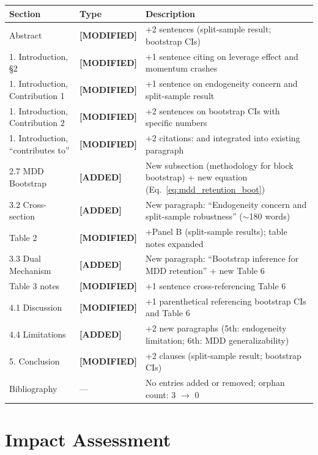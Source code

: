 \documentclass[12pt,a4paper]{article}
\newcommand{\ADDED}{\textcolor{added}{\textbf{[ADDED]}}}
\newcommand{\MODIFIED}{\textcolor{modified}{\textbf{[MODIFIED]}}}
\begin{document}
\begin{longtable}{@{}p{3.5cm}p{1.5cm}p{9cm}@{}}
\toprule
Section & Type & Description \\
\midrule
\endhead
Abstract & \MODIFIED & +2 sentences (split-sample result; bootstrap CIs) \\
\midrule
1. Introduction, \S2 & \MODIFIED & +1 sentence citing \citet{barroso2015} on leverage effect and momentum crashes \\
\midrule
1. Introduction, Contribution 1 & \MODIFIED & +1 sentence on endogeneity concern and split-sample result \\
\midrule
1. Introduction, Contribution 2 & \MODIFIED & +2 sentences on bootstrap CIs with specific numbers \\
\midrule
1. Introduction, ``contributes to'' & \MODIFIED & +2 citations: \citet{daniel2016} and \citet{fleming2001} integrated into existing paragraph \\
\midrule
2.7 MDD Bootstrap & \ADDED & New subsection (methodology for block bootstrap) + new equation (Eq.~\ref{eq:mdd_retention_boot}) \\
\midrule
3.2 Cross-section & \ADDED & New paragraph: ``Endogeneity concern and split-sample robustness'' ($\sim$180 words) \\
\midrule
Table 2 & \MODIFIED & +Panel B (split-sample results); table notes expanded \\
\midrule
3.3 Dual Mechanism & \ADDED & New paragraph: ``Bootstrap inference for MDD retention'' + new Table 6 \\
\midrule
Table 3 notes & \MODIFIED & +1 sentence cross-referencing Table 6 \\
\midrule
4.1 Discussion & \MODIFIED & +1 parenthetical referencing bootstrap CIs and Table 6 \\
\midrule
4.4 Limitations & \ADDED & +2 new paragraphs (5th: endogeneity limitation; 6th: MDD generalizability) \\
\midrule
5. Conclusion & \MODIFIED & +2 clauses (split-sample result; bootstrap CIs) \\
\midrule
Bibliography & --- & No entries added or removed; orphan count: 3 $\to$ 0 \\
\bottomrule
\end{longtable}


\section{Impact Assessment}
\end{document}
